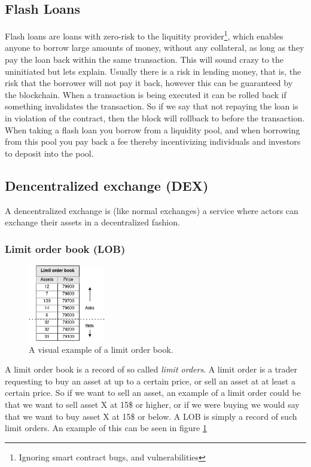 \subsection{Flash Loans}
Flash loans are loans with zero-risk to the liquitity provider\footnote{Ignoring
smart contract bugs, and vulnerabilities}, which enables anyone to borrow large
amounts of money, without any collateral, as long as they pay the loan
back within the same transaction. This will sound crazy to the uninitiated but
lets explain. Usually there is a risk in lending money, that is, the risk that
the borrower will not pay it back, however this can be guaranteed by the
blockchain. When a transaction is being executed it can be rolled back if
something invalidates the transaction. So if we say that not repaying the loan
is in violation of the contract, then the block will rollback to before the
transaction.\\

When taking a flash loan you borrow from a liquidity pool, and when borrowing
from this pool you pay back a fee thereby incentivizing individuals and
investors to deposit into the pool.

\subsection{Dencentralized exchange (DEX)}
A dencentralized exchange is (like normal exchanges) a service where actors can
exchange their assets in a decentralized fashion.

\subsubsection{Limit order book (LOB)}
\begin{figure}
  \centering
  \includegraphics[width=0.3\textwidth]{assests/Flash-loans-LOB}
  \caption{A visual example of a limit order book.}
  \label{fig:LOB}
\end{figure}
A limit order book is a record of so called \textit{limit orders}. A limit order
is a trader requesting to buy an asset at up to a certain price, or sell an
asset at at least a certain price. So if we want to sell an asset, an example of
a limit order could be that we want to sell asset X at 15\$ or higher, or if we
were buying we would say that we want to buy asset X at 15\$ or below. A LOB is
simply a record of such limit orders. An example of this can be seen in figure
\ref{fig:LOB}

